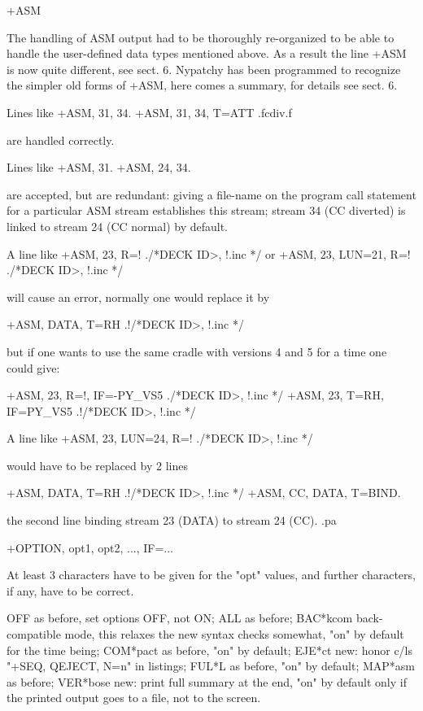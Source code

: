\item
+ASM

The handling of ASM output had to be thoroughly re-organized to
be able to handle the user-defined data types mentioned above.
As a result the line +ASM is now quite different, see sect. 6.
Nypatchy has been programmed to recognize the simpler old forms
of +ASM, here comes a summary, for details see sect. 6.

Lines like
              +ASM, 31, 34.
              +ASM, 31, 34, T=ATT   .fcdiv.f

are handled correctly.

Lines like
              +ASM, 31.
              +ASM, 24, 34.

are accepted, but are redundant: giving a file-name on the program
call statement for a particular ASM stream establishes this stream;
stream 34 (CC diverted) is linked to stream 24 (CC normal) by default.

A line like
              +ASM, 23, R=!           ./*DECK ID>, !.inc */
          or  +ASM, 23, LUN=21, R=!   ./*DECK ID>, !.inc */

will cause an error, normally one would replace it by

              +ASM, DATA, T=RH  .!/*DECK ID>, !.inc */

but if one wants to use the same cradle with versions 4 and 5 for
a time one could give:

              +ASM, 23, R=!, IF=-PY_VS5   ./*DECK ID>, !.inc */
              +ASM, 23, T=RH, IF=PY_VS5  .!/*DECK ID>, !.inc */

A line like
              +ASM, 23, LUN=24, R=!   ./*DECK ID>, !.inc */

would have to be replaced by 2 lines

              +ASM, DATA, T=RH  .!/*DECK ID>, !.inc */
              +ASM, CC, DATA, T=BIND.

the second line binding stream 23 (DATA) to stream 24 (CC).
.pa

\item
+OPTION, opt1, opt2, ..., IF=...

At least 3 characters have to be given for the "opt" values,
and further characters, if any, have to be correct.

      OFF        as before, set options OFF, not ON;
      ALL        as before;
      BAC*kcom   back-compatible mode, this relaxes the new syntax
                 checks somewhat, "on" by default for the time being;
      COM*pact   as before, "on" by default;
      EJE*ct     new: honor c/ls "+SEQ, QEJECT, N=n" in listings;
      FUL*L      as before, "on" by default;
      MAP*asm    as before;
      VER*bose   new: print full summary at the end,
                 "on" by default only if the printed output goes
                 to a file, not to the screen.


